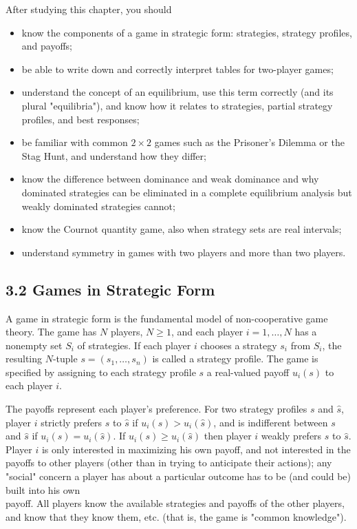 \documentclass[12pt]{article}
\begin{document}
After studying this chapter, you should

\begin{itemize}
  \item know the components of a game in strategic form: strategies, strategy profiles, and payoffs;
  \item be able to write down and correctly interpret tables for two-player games;
  \item understand the concept of an equilibrium, use this term correctly (and its plural "equilibria"), and know how it relates to strategies, partial strategy profiles, and best responses;
  \item be familiar with common $2 \times 2$ games such as the Prisoner's Dilemma or the Stag Hunt, and understand how they differ;
  \item know the difference between dominance and weak dominance and why dominated strategies can be eliminated in a complete equilibrium analysis but weakly dominated strategies cannot;
  \item know the Cournot quantity game, also when strategy sets are real intervals;
  \item understand symmetry in games with two players and more than two players.
\end{itemize}

\subsection*{3.2 Games in Strategic Form}
A game in strategic form is the fundamental model of non-cooperative game theory. The game has $N$ players, $N \geq 1$, and each player $i=1, \ldots, N$ has a nonempty set $S_{i}$ of strategies. If each player $i$ chooses a strategy $s_{i}$ from $S_{i}$, the resulting $N$-tuple $s=\left(s_{1}, \ldots, s_{n}\right)$ is called a strategy profile. The game is specified by assigning to each strategy profile $s$ a real-valued payoff $u_{i}(s)$ to each player $i$.

The payoffs represent each player's preference. For two strategy profiles $s$ and $\hat{s}$, player $i$ strictly prefers $s$ to $\hat{s}$ if $u_{i}(s)>u_{i}(\hat{s})$, and is indifferent between $s$ and $\hat{s}$ if $u_{i}(s)=u_{i}(\hat{s})$. If $u_{i}(s) \geq u_{i}(\hat{s})$ then player $i$ weakly prefers $s$ to $\hat{s}$. Player $i$ is only interested in maximizing his own payoff, and not interested in the payoffs to other players (other than in trying to anticipate their actions); any "social" concern a player has about a particular outcome has to be (and could be) built into his own\\
payoff. All players know the available strategies and payoffs of the other players, and know that they know them, etc. (that is, the game is "common knowledge").
\end{document}
